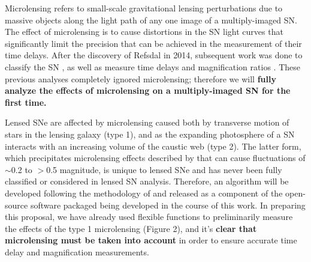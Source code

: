 \bigskip


Microlensing refers to small-scale gravitational lensing
perturbations due to massive objects along the light path of any one image of a
multiply-imaged SN. The effect of microlensing is to cause distortions in the SN light
curves that significantly limit the precision that can be achieved in the measurement of 
their time delays. After the discovery of Refsdal in 2014, subsequent work was done to 
classify the SN \citep{Kelly:2016}, as well as measure time delays and magnification
ratios \citep{Rodney:2016}. These previous analyses completely ignored microlensing; 
therefore we will \textbf{fully analyze the effects of microlensing on a multiply-imaged SN for the first time.}

Lensed SNe are affected by microlensing caused both by transverse motion of stars in the lensing galaxy (type 1), and as the
expanding photosphere of a SN interacts with an increasing volume of the caustic web (type 2). The latter form, which precipitates
microlensing effects described by \cite{Dobler:2006} that can cause fluctuations of $\sim$0.2 to $>$0.5 magnitude, is unique 
to lensed SNe and has never been fully classified or considered in lensed SN analysis. Therefore, an algorithm will be developed 
following the methodology of \cite{Dobler:2006} and released as a component of the open-source software packaged being 
developed in the course of this work. In preparing this proposal, we have already used flexible functions to preliminarily 
measure the effects of the type 1 microlensing (Figure 2), and it's \textbf{clear that microlensing must be taken into account} in order
to ensure accurate time delay and magnification measurements. 


